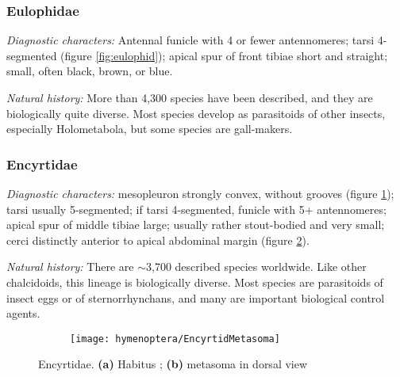 \subsubsection{Eulophidae}
\noindent{}\textit{Diagnostic characters:} Antennal funicle with 4 or fewer antennomeres; tarsi 4-segmented (figure \ref{fig:eulophid}); apical spur of front tibiae short and straight; small, often black, brown, or blue.\vspace{3mm}

\noindent{}\textit{Natural history:} More than 4,300 species have been described, and they are biologically quite  diverse. Most species develop as parasitoids of other insects, especially Holometabola, but some species are gall-makers.\vspace{3mm}

\subsubsection{Encyrtidae}
\noindent{}\textit{Diagnostic characters:} mesopleuron strongly convex, without grooves (figure \ref{fig:encyrt1}); tarsi usually 5-segmented; if tarsi 4-segmented, funicle with 5+ antennomeres; apical spur of middle tibiae large; usually rather stout-bodied and very small; cerci distinctly anterior to apical abdominal margin (figure \ref{fig:encyrt2}).\vspace{3mm}

\noindent{}\textit{Natural history:} There are $\sim$3,700 described species worldwide. Like other chalcidoids, this lineage is biologically diverse. Most species are parasitoids of insect eggs or  of sternorrhynchans, and many are important biological control agents.\vspace{3mm}

\begin{figure}[ht!]
  \centering
\begin{subfigure}[ht!]{0.55\textwidth}
  \caption{}
  \label{fig:encyrt1}
\end{subfigure}
    \hfill
\begin{subfigure}[ht!]{0.35\textwidth}
\texttt{[image: hymenoptera/EncyrtidMetasoma]}
  \caption{}
  \label{fig:encyrt2}
\end{subfigure}
    \caption{Encyrtidae. \textbf{(a)} Habitus \citep[redrawn from][]{nearcticChalcidoids}; \textbf{(b)} metasoma in dorsal view \citep[][pg. 581]{goulet1993hymenoptera}}\label{fig:encyrt}
\end{figure}

